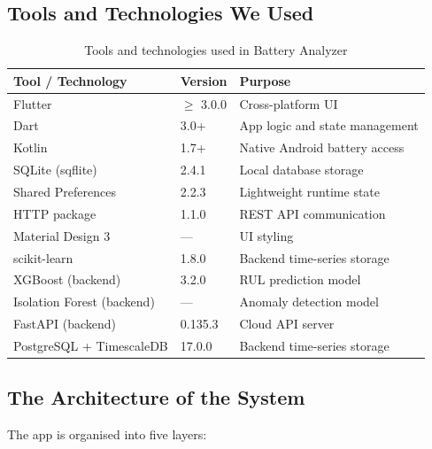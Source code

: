 \documentclass[12pt,a4paper]{report}
\begin{document}
\subsection{Tools and Technologies We Used}
\begin{table}[H]
\caption{Tools and technologies used in Battery Analyzer}
\centering
\small
\begin{tabular}{lll}
\toprule
\textbf{Tool / Technology} & \textbf{Version} & \textbf{Purpose}\\
\midrule
Flutter        & $\geq$ 3.0.0 & Cross-platform UI\\
Dart           & 3.0+         & App logic and state management\\
Kotlin         & 1.7+         & Native Android battery access\\
SQLite (sqflite) & 2.4.1     & Local database storage\\
Shared Preferences & 2.2.3   & Lightweight runtime state\\
HTTP package   & 1.1.0        & REST API communication\\
Material Design 3 & ---       & UI styling\\
scikit-learn & 1.8.0 & Backend time-series storage\\
XGBoost (backend) & 3.2.0       & RUL prediction model\\
Isolation Forest (backend) & --- & Anomaly detection model\\
FastAPI (backend) & 0.135.3      & Cloud API server\\
PostgreSQL + TimescaleDB & 17.0.0 & Backend time-series storage\\
\bottomrule
\end{tabular}
\end{table}

\subsection{The Architecture of the System}

The app is organised into five layers:
\end{document}
